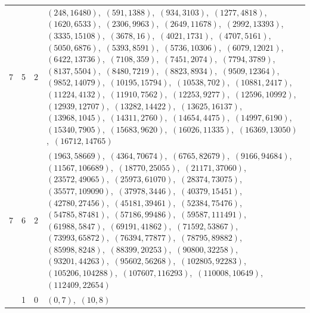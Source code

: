 \documentclass[11pt]{article}
\begin{document}
{\begin{longtable}{@{}rrl>{\raggedright\arraybackslash}p{}@{}}
7 & 5 & $2$ & $(248,16480)$,\allowbreak\ $(591,1388)$,\allowbreak\ $(934,3103)$,\allowbreak\ $(1277,4818)$,\allowbreak\ $(1620,6533)$,\allowbreak\ $(2306,9963)$,\allowbreak\ $(2649,11678)$,\allowbreak\ $(2992,13393)$,\allowbreak\ $(3335,15108)$,\allowbreak\ $(3678,16)$,\allowbreak\ $(4021,1731)$,\allowbreak\ $(4707,5161)$,\allowbreak\ $(5050,6876)$,\allowbreak\ $(5393,8591)$,\allowbreak\ $(5736,10306)$,\allowbreak\ $(6079,12021)$,\allowbreak\ $(6422,13736)$,\allowbreak\ $(7108,359)$,\allowbreak\ $(7451,2074)$,\allowbreak\ $(7794,3789)$,\allowbreak\ $(8137,5504)$,\allowbreak\ $(8480,7219)$,\allowbreak\ $(8823,8934)$,\allowbreak\ $(9509,12364)$,\allowbreak\ $(9852,14079)$,\allowbreak\ $(10195,15794)$,\allowbreak\ $(10538,702)$,\allowbreak\ $(10881,2417)$,\allowbreak\ $(11224,4132)$,\allowbreak\ $(11910,7562)$,\allowbreak\ $(12253,9277)$,\allowbreak\ $(12596,10992)$,\allowbreak\ $(12939,12707)$,\allowbreak\ $(13282,14422)$,\allowbreak\ $(13625,16137)$,\allowbreak\ $(13968,1045)$,\allowbreak\ $(14311,2760)$,\allowbreak\ $(14654,4475)$,\allowbreak\ $(14997,6190)$,\allowbreak\ $(15340,7905)$,\allowbreak\ $(15683,9620)$,\allowbreak\ $(16026,11335)$,\allowbreak\ $(16369,13050)$,\allowbreak\ $(16712,14765)$\\
7 & 6 & $2$ & $(1963,58669)$,\allowbreak\ $(4364,70674)$,\allowbreak\ $(6765,82679)$,\allowbreak\ $(9166,94684)$,\allowbreak\ $(11567,106689)$,\allowbreak\ $(18770,25055)$,\allowbreak\ $(21171,37060)$,\allowbreak\ $(23572,49065)$,\allowbreak\ $(25973,61070)$,\allowbreak\ $(28374,73075)$,\allowbreak\ $(35577,109090)$,\allowbreak\ $(37978,3446)$,\allowbreak\ $(40379,15451)$,\allowbreak\ $(42780,27456)$,\allowbreak\ $(45181,39461)$,\allowbreak\ $(52384,75476)$,\allowbreak\ $(54785,87481)$,\allowbreak\ $(57186,99486)$,\allowbreak\ $(59587,111491)$,\allowbreak\ $(61988,5847)$,\allowbreak\ $(69191,41862)$,\allowbreak\ $(71592,53867)$,\allowbreak\ $(73993,65872)$,\allowbreak\ $(76394,77877)$,\allowbreak\ $(78795,89882)$,\allowbreak\ $(85998,8248)$,\allowbreak\ $(88399,20253)$,\allowbreak\ $(90800,32258)$,\allowbreak\ $(93201,44263)$,\allowbreak\ $(95602,56268)$,\allowbreak\ $(102805,92283)$,\allowbreak\ $(105206,104288)$,\allowbreak\ $(107607,116293)$,\allowbreak\ $(110008,10649)$,\allowbreak\ $(112409,22654)$\\
\addlinespace[3pt]
13 & 1 & $0$ & $(0,7)$,\allowbreak\ $(10,8)$\\

\end{longtable}}
\end{document}
